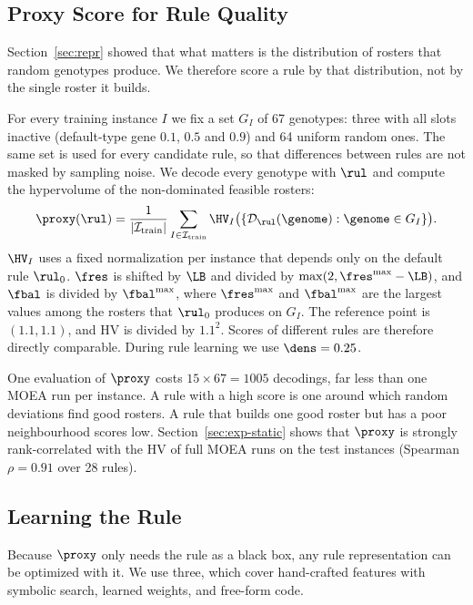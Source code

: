 \subsection{Proxy Score for Rule Quality}
\label{sec:method:proxy}

Section~\ref{sec:repr} showed that what matters is the distribution of rosters that random genotypes produce.
We therefore score a rule by that distribution, not by the single roster it builds.

For every training instance $I$ we fix a set $G_I$ of 67 genotypes:
three with all slots inactive (default-type gene $0.1$, $0.5$ and $0.9$) and 64 uniform random ones.
The same set is used for every candidate rule, so that differences between rules are not masked by sampling noise.
We decode every genotype with $\rul$ and compute the hypervolume of the non-dominated feasible rosters:
\begin{equation}
  \proxy(\rul) = \frac{1}{|\mathcal{I}_{\text{train}}|} \sum_{I \in \mathcal{I}_{\text{train}}} \HV_I\bigl(\{\mathcal{D}_\rul(\genome) : \genome \in G_I\}\bigr).
\end{equation}
$\HV_I$ uses a fixed normalization per instance that depends only on the default rule $\rul_0$.
$\fres$ is shifted by $\LB$ and divided by $\max(2, \fres^{\max} - \LB)$, and $\fbal$ is divided by $\fbal^{\max}$,
where $\fres^{\max}$ and $\fbal^{\max}$ are the largest values among the rosters that $\rul_0$ produces on $G_I$.
The reference point is $(1.1, 1.1)$, and HV is divided by $1.1^2$.
Scores of different rules are therefore directly comparable.
During rule learning we use $\dens = 0.25$.

One evaluation of $\proxy$ costs $15 \times 67 = 1005$ decodings, far less than one MOEA run per instance.
A rule with a high score is one around which random deviations find good rosters.
A rule that builds one good roster but has a poor neighbourhood scores low.
Section~\ref{sec:exp-static} shows that $\proxy$ is strongly rank-correlated with the HV of full MOEA runs on the test instances (Spearman $\rho = 0.91$ over 28 rules).

\subsection{Learning the Rule}
\label{sec:method:acquisition}

Because $\proxy$ only needs the rule as a black box, any rule representation can be optimized with it.
We use three, which cover hand-crafted features with symbolic search, learned weights, and free-form code.


